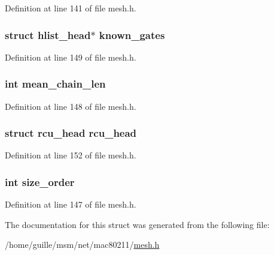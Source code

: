 Definition at line 141 of file mesh.\-h.

\hypertarget{structmesh__table_a3c40962f5ca0faa5387ad1e91a2c7ba6}{
\subsubsection[{known\-\_\-gates}]{\setlength{\rightskip}{0pt plus 5cm}struct hlist\-\_\-head$\ast$ known\-\_\-gates}}\label{structmesh__table_a3c40962f5ca0faa5387ad1e91a2c7ba6}


Definition at line 149 of file mesh.\-h.

\hypertarget{structmesh__table_a05410cec7cda00c16011e39666056c20}{
\subsubsection[{mean\-\_\-chain\-\_\-len}]{\setlength{\rightskip}{0pt plus 5cm}int mean\-\_\-chain\-\_\-len}}\label{structmesh__table_a05410cec7cda00c16011e39666056c20}


Definition at line 148 of file mesh.\-h.

\hypertarget{structmesh__table_ab698383409a24791490f962fe6990655}{
\subsubsection[{rcu\-\_\-head}]{\setlength{\rightskip}{0pt plus 5cm}struct rcu\-\_\-head rcu\-\_\-head}}\label{structmesh__table_ab698383409a24791490f962fe6990655}


Definition at line 152 of file mesh.\-h.

\hypertarget{structmesh__table_af2ece8f794fc2b70104b44cde3421003}{
\subsubsection[{size\-\_\-order}]{\setlength{\rightskip}{0pt plus 5cm}int size\-\_\-order}}\label{structmesh__table_af2ece8f794fc2b70104b44cde3421003}


Definition at line 147 of file mesh.\-h.



The documentation for this struct was generated from the following file\-:\begin{DoxyCompactItemize}
\item 
/home/guille/msm/net/mac80211/\hyperlink{mesh_8h}{mesh.\-h}\end{DoxyCompactItemize}

